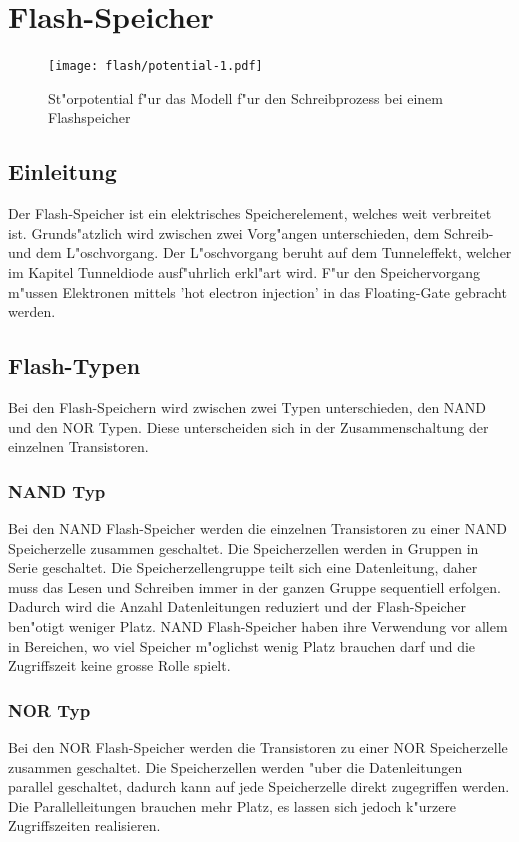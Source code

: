 \chapter{Flash-Speicher\label{chapter:flash}}
\begin{refsection}

\begin{figure}
\centering
\texttt{[image: flash/potential-1.pdf]}
\caption{St"orpotential f"ur das Modell f"ur den Schreibprozess bei
einem Flashspeicher}
\end{figure}

\section{Einleitung}
Der Flash-Speicher ist ein elektrisches Speicherelement, welches weit verbreitet ist. Grunds"atzlich wird zwischen zwei Vorg"angen unterschieden, dem Schreib- und dem L"oschvorgang. Der L"oschvorgang beruht auf dem Tunneleffekt, welcher im Kapitel Tunneldiode ausf"uhrlich erkl"art wird. F"ur den Speichervorgang m"ussen Elektronen mittels 'hot electron injection' in das Floating-Gate gebracht werden. 

\section{Flash-Typen}
Bei den Flash-Speichern wird zwischen zwei Typen unterschieden, den NAND und den NOR Typen. Diese unterscheiden sich in der Zusammenschaltung der einzelnen Transistoren. 

\subsection{NAND Typ}
Bei den NAND Flash-Speicher werden die einzelnen Transistoren zu einer NAND Speicherzelle zusammen geschaltet. Die Speicherzellen werden in Gruppen in Serie geschaltet. Die Speicherzellengruppe teilt sich eine Datenleitung, daher muss das Lesen und Schreiben immer in der ganzen Gruppe sequentiell erfolgen. Dadurch wird die Anzahl Datenleitungen reduziert und der Flash-Speicher ben"otigt weniger Platz. NAND Flash-Speicher haben ihre Verwendung vor allem in Bereichen, wo viel Speicher m"oglichst wenig Platz brauchen darf und die Zugriffszeit keine grosse Rolle spielt.
\subsection{NOR Typ}
Bei den NOR Flash-Speicher werden die Transistoren zu einer NOR Speicherzelle zusammen geschaltet.
Die Speicherzellen werden "uber die Datenleitungen parallel geschaltet, dadurch kann auf jede Speicherzelle direkt zugegriffen werden. Die Parallelleitungen brauchen mehr Platz, es lassen sich jedoch k"urzere Zugriffszeiten realisieren.


\end{refsection}
